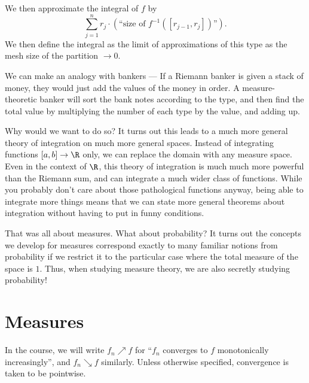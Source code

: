 \documentclass[a4paper]{article}
\begin{document}
We then approximate the integral of $f$ by
\[
  \sum_{j = 1}^n r_j \cdot (\text{``size of }f^{-1}([r_{j - 1}, r_j])\text{''}).
\]
We then define the integral as the limit of approximations of this type as the mesh size of the partition $\to 0$.
\begin{center}
\end{center}
We can make an analogy with bankers --- If a Riemann banker is given a stack of money, they would just add the values of the money in order. A measure-theoretic banker will sort the bank notes according to the type, and then find the total value by multiplying the number of each type by the value, and adding up.

Why would we want to do so? It turns out this leads to a much more general theory of integration on much more general spaces. Instead of integrating functions $[a, b] \to \R$ only, we can replace the domain with any measure space. Even in the context of $\R$, this theory of integration is much much more powerful than the Riemann sum, and can integrate a much wider class of functions. While you probably don't care about those pathological functions anyway, being able to integrate more things means that we can state more general theorems about integration without having to put in funny conditions.

That was all about measures. What about probability? It turns out the concepts we develop for measures correspond exactly to many familiar notions from probability if we restrict it to the particular case where the total measure of the space is $1$. Thus, when studying measure theory, we are also secretly studying probability!

\section{Measures}
In the course, we will write $f_n \nearrow f$ for ``$f_n$ converges to $f$ monotonically increasingly'', and $f_n \searrow f$ similarly. Unless otherwise specified, convergence is taken to be pointwise.
\end{document}
